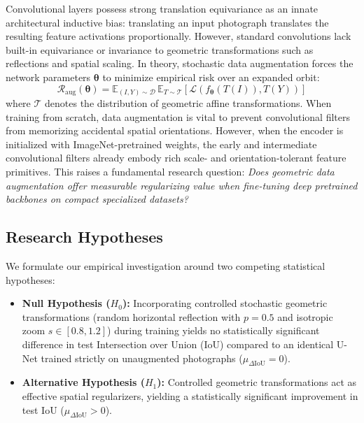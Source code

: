 \documentclass[10pt,a4paper]{article}
\begin{document}
Convolutional layers possess strong translation equivariance as an innate architectural inductive bias: translating an input photograph translates the resulting feature activations proportionally. However, standard convolutions lack built-in equivariance or invariance to geometric transformations such as reflections and spatial scaling. In theory, stochastic data augmentation forces the network parameters $\bm{\theta}$ to minimize empirical risk over an expanded orbit:
\begin{equation}
    \mathcal{R}_{\text{aug}}(\bm{\theta}) = \mathbb{E}_{(I, Y) \sim \mathcal{D}} \, \mathbb{E}_{T \sim \mathcal{T}} \left[ \mathcal{L}\left(f_{\bm{\theta}}(T(I)), T(Y)\right) \right]
    \label{eq:risk_aug}
\end{equation}
where $\mathcal{T}$ denotes the distribution of geometric affine transformations. When training from scratch, data augmentation is vital to prevent convolutional filters from memorizing accidental spatial orientations. However, when the encoder is initialized with ImageNet-pretrained weights, the early and intermediate convolutional filters already embody rich scale- and orientation-tolerant feature primitives. This raises a fundamental research question: \textit{Does geometric data augmentation offer measurable regularizing value when fine-tuning deep pretrained backbones on compact specialized datasets?}

\subsection{Research Hypotheses}
We formulate our empirical investigation around two competing statistical hypotheses:
\begin{itemize}
    \item \textbf{Null Hypothesis ($H_0$):} Incorporating controlled stochastic geometric transformations (random horizontal reflection with $p=0.5$ and isotropic zoom $s \in [0.8, 1.2]$) during training yields no statistically significant difference in test Intersection over Union ($\text{IoU}$) compared to an identical U-Net trained strictly on unaugmented photographs ($\mu_{\Delta \text{IoU}} = 0$).
    \item \textbf{Alternative Hypothesis ($H_1$):} Controlled geometric transformations act as effective spatial regularizers, yielding a statistically significant improvement in test $\text{IoU}$ ($\mu_{\Delta \text{IoU}} > 0$).
\end{itemize}
\end{document}
